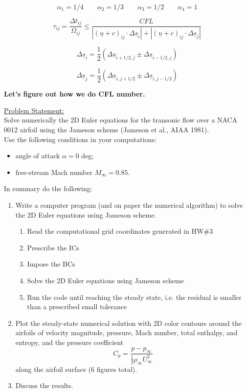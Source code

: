 \documentclass[12pt]{article}
\begin{document}
\begin{itemize}
    $$ \alpha_1 = 1/4 \quad \quad \alpha_2 = 1/3 \quad \quad \alpha_3 = 1/2 \quad \quad \alpha_4 = 1 $$
    
    $$ \tau_{ij} = \frac{\Delta t_{ij}}{\Omega_{ij}} \leq \frac{CFL}{|(\underline{u}+c)_{ij} \cdot \Delta\underline{s}_i | + |(\underline{u}+c)_{ij} \cdot \Delta\underline{s}_j|} $$
    
    $$ \Delta\underline{s}_i = \frac 1 2 \left( \Delta\underline{s}_{i+1/2,j} \pm \Delta\underline{s}_{i-1/2,j} \right) $$
    
    $$ \Delta\underline{s}_j = \frac 1 2 \left( \Delta\underline{s}_{i,j+1/2} \pm \Delta\underline{s}_{i,j-1/2} \right) $$
    
\end{itemize}

\textbf{Let's figure out how we do CFL number.}


\newpage

\underline{Problem Statement:}\\
Solve numerically the 2D Euler equations for the transonic flow over a NACA 0012 airfoil using the Jameson scheme (Jameson et al., AIAA 1981).\\
Use the following conditions in your computations:

\begin{itemize}
    \item angle of attack $\alpha = 0$ deg;
    \item free-stream Mach number $M_{\infty} = 0.85$.
\end{itemize}

In summary do the following:
\begin{enumerate}
    \item Write a computer program (and on paper the numerical algorithm) to solve the 2D Euler equations using Jameson scheme.
    \begin{enumerate}
        \item Read the computational grid coordinates generated in HW\#3
        \item Prescribe the ICs
        \item Impose the BCs
        \item Solve the 2D Euler equations using Jameson scheme
        \item Run the code until reaching the steady state, i.e. the residual is smaller than a prescribed small tolerance
    \end{enumerate}
    \item Plot the steady-state numerical solution with 2D color contours around the airfoils of velocity magnitude, pressure, Mach number, total enthalpy, and entropy, and the pressure coefficient
    $$ C_p = \frac{p-p_\infty}{\frac{1}{2} \rho_\infty U_\infty^2}$$
    along the airfoil surface (6 figures total).
    \item Discuss the results.
\end{enumerate}
\end{document}
